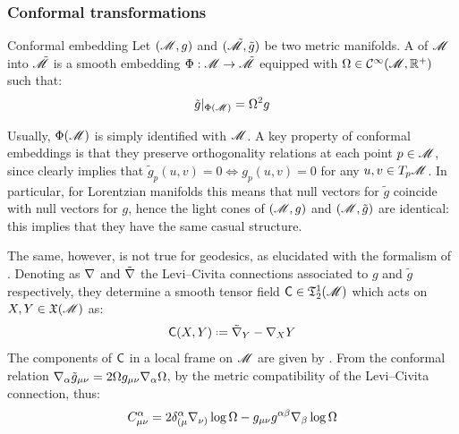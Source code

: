 \subsubsection{Conformal transformations}

\begin{definition}{Conformal embedding}{}
  Let $ (\mathscr{M} , g) $ and $ (\tilde{\mathscr{M}} , \tilde{g}) $ be two metric manifolds. A  of $ \mathscr{M} $ into $ \tilde{\mathscr{M}} $ is a smooth embedding $ \Phi : \mathscr{M} \rightarrow \tilde{\mathscr{M}} $ equipped with $ \Omega \in \mathcal{C}^{\infty}(\mathscr{M} , \mathbb{R}^+) $ such that:
  \begin{equation}
    \tilde{g} \vert_{\Phi(\mathscr{M})} = \Omega^2 g
    \label{eq:conformal-relation}
  \end{equation}
\end{definition}

Usually, $ \Phi(\mathscr{M}) $ is simply identified with $ \mathscr{M} $. A key property of conformal embeddings is that they preserve orthogonality relations at each point $ p \in \mathscr{M} $, since  clearly implies that $ \tilde{g}_p(u,v) = 0 \iff g_p(u,v) = 0 $ for any $ u,v \in T_p\mathscr{M} $. In particular, for Lorentzian manifolds this means that null vectors for $ \tilde{g} $ coincide with null vectors for $ g $, hence the light cones of $ (\mathscr{M} , g) $ and $ (\mathscr{M} , \tilde{g}) $ are identical: this implies that they have the same casual structure.

The same, however, is not true for geodesics, as elucidated with the formalism of . Denoting as $ \nabla $ and $ \tilde{\nabla} $ the Levi--Civita connections associated to $ g $ and $ \tilde{g} $ respectively, they determine a smooth tensor field $ \textsf{C} \in \mathfrak{T}^{1}_{2}(\mathscr{M}) $ which acts on $ X,Y \in \mathfrak{X}(\mathscr{M}) $ as:
\begin{equation}
  \cont(X , Y) \defeq \tilde{\na}_Y - \na_X Y
  \label{eq:connection-tensor}
\end{equation}
The components of $ \textsf{C} $ in a local frame on $ \mathscr{M} $ are given by . From the conformal relation  $ \nabla_\alpha \tilde{g}_{\mu \nu} = 2 \Omega g_{\mu \nu} \nabla_\alpha \Omega $, by the metric compatibility of the Levi--Civita connection, thus:
\begin{equation}
  C^\alpha_{\mu \nu} = 2 \delta^\alpha_{(\mu} \nabla_{\nu)} \log \Omega - g_{\mu \nu} g^{\alpha \beta} \nabla_\beta \log \Omega
  \label{eq:conformal-difference-tensor}
\end{equation}

